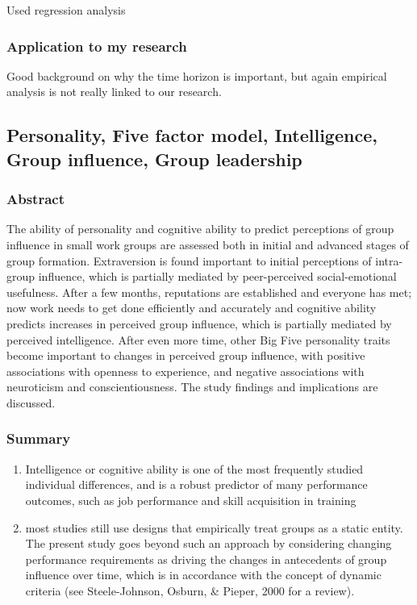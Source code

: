 \documentclass[12pt]{article}
\begin{document}
Used regression analysis

\subsubsection*{Application to my research}

Good background on why the time horizon is important, but again empirical analysis is not really linked to our research. 


\subsection*{Personality, Five factor model, Intelligence, Group influence, Group leadership\cite{personality_five_factor}}

\subsubsection*{Abstract}

The ability of personality and cognitive ability to predict perceptions of group influence in small work groups are assessed both in initial and advanced stages of group formation. Extraversion is found important to initial perceptions of intra-group influence, which is partially mediated by peer-perceived social-emotional usefulness. After a few months, reputations are established and everyone has met; now work needs to get done efficiently and accurately and cognitive ability predicts increases in perceived group influence, which is partially mediated by perceived intelligence. After even more time, other Big Five personality traits become important to changes in perceived group influence, with positive associations with openness to experience, and negative associations with neuroticism and conscientiousness. The study findings and implications are discussed.

\subsubsection*{Summary}

\begin{enumerate}
    \item Intelligence or cognitive ability is one of the most frequently studied individual differences, and is a robust predictor of many performance outcomes, such as job performance and skill acquisition in training
    \item most studies still use designs that empirically treat groups as a static entity. The present study goes beyond such an approach by considering changing performance requirements as driving the changes in antecedents of group influence over time, which is in accordance with the concept of dynamic criteria (see Steele-Johnson, Osburn, \& Pieper, 2000 for a review).
\end{enumerate}
\end{document}
